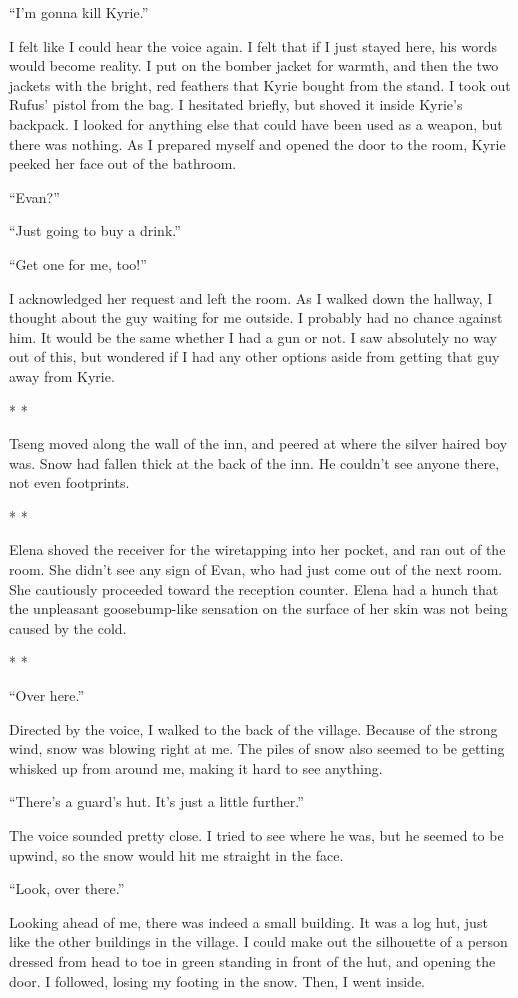 \documentclass[oneside]{book}
\begin{document}
“I’m gonna kill Kyrie.”

I felt like I could hear the voice again. I felt that if I just stayed here, his words would become reality. I put on the bomber jacket for warmth, and then the two jackets with the bright, red feathers that Kyrie bought from the stand. I took out Rufus’ pistol from the bag. I hesitated briefly, but shoved it inside Kyrie’s backpack. I looked for anything else that could have been used as a weapon, but there was nothing. As I prepared myself and opened the door to the room, Kyrie peeked her face out of the bathroom.

“Evan?”

“Just going to buy a drink.”

“Get one for me, too!”

I acknowledged her request and left the room. As I walked down the hallway, I thought about the guy waiting for me outside. I probably had no chance against him. It would be the same whether I had a gun or not. I saw absolutely no way out of this, but wondered if I had any other options aside from getting that guy away from Kyrie.

* *

Tseng moved along the wall of the inn, and peered at where the silver haired boy was. Snow had fallen thick at the back of the inn. He couldn’t see anyone there, not even footprints.

* *

Elena shoved the receiver for the wiretapping into her pocket, and ran out of the room. She didn’t see any sign of Evan, who had just come out of the next room. She cautiously proceeded toward the reception counter. Elena had a hunch that the unpleasant goosebump-like sensation on the surface of her skin was not being caused by the cold.

* *

“Over here.”

Directed by the voice, I walked to the back of the village. Because of the strong wind, snow was blowing right at me. The piles of snow also seemed to be getting whisked up from around me, making it hard to see anything.

“There’s a guard’s hut. It’s just a little further.”

The voice sounded pretty close. I tried to see where he was, but he seemed to be upwind, so the snow would hit me straight in the face.

“Look, over there.”

Looking ahead of me, there was indeed a small building. It was a log hut, just like the other buildings in the village. I could make out the silhouette of a person dressed from head to toe in green standing in front of the hut, and opening the door. I followed, losing my footing in the snow. Then, I went inside.
\end{document}
